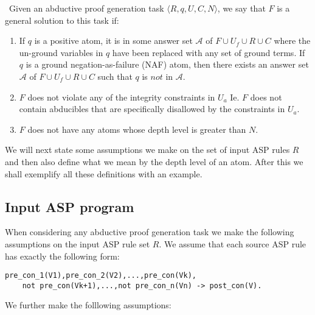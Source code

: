 \begin{definition}\label{def:abductive_proof_generation_solution} \
Given an abductive proof generation task $\langle R,q,U,C,N \rangle$, we say that $F$ is a general solution to this task if:
\begin{enumerate}
    \item If $q$ is a positive atom, it is in some answer set $\mathcal{A}$ of $F\cup U_{f}\cup R\cup C$ where the un-ground variables in $q$ have been replaced with any set of ground terms. If $q$ is a ground negation-as-failure (NAF) atom, then there exists an answer set $\mathcal{A}$ of $F\cup U_{f}\cup R\cup C$ such that $q$ is $not$ in $\mathcal{A}$.
    \item $F$ does not violate any of the integrity constraints in $U_{a}$ Ie. $F$ does not contain abducibles that are specifically disallowed by the constraints in $U_{a}$.
    \item $F$ does not have any atoms whose depth level is greater than $N$.
\end{enumerate}
\end{definition} We will next state some assumptions we make on the set of input ASP rules $R$ and then also define what we mean by the depth level of an atom. After this we shall exemplify all these definitions with an example. 
\subsection{Input ASP program}
When considering any abductive proof generation task we make the following assumptions on the input ASP rule set $R$. We assume that each source ASP rule has exactly the following form:
\begin{lstlisting}[frame=none]
pre_con_1(V1),pre_con_2(V2),...,pre_con(Vk),
    not pre_con(Vk+1),...,not pre_con_n(Vn) -> post_con(V).
\end{lstlisting}
We further make the folllowing assumptions:

